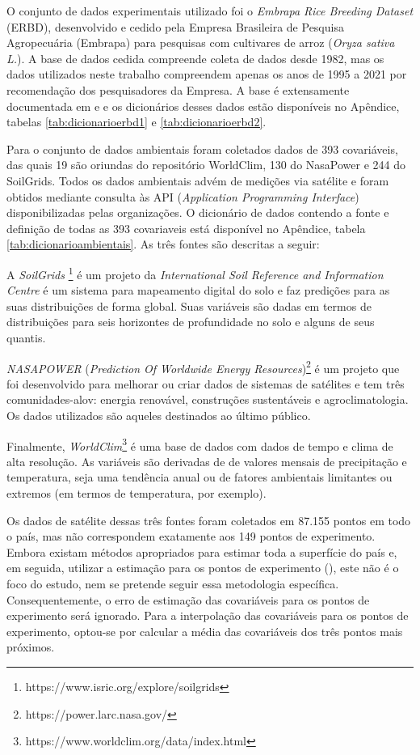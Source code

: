 \documentclass[12pt, a4paper, twoside]{report}
\numberwithin{equation}{subsection} %
\begin{document}

O conjunto de dados experimentais utilizado foi o \textit{Embrapa Rice Breeding Dataset} (ERBD), desenvolvido e cedido pela Empresa Brasileira de Pesquisa Agropecuária (Embrapa) para pesquisas com cultivares de arroz (\textit{Oryza sativa L.}). A base de dados cedida compreende coleta de dados desde 1982, mas os dados utilizados neste trabalho compreendem apenas os anos de 1995 a 2021 por recomendação dos pesquisadores da Empresa. A base é extensamente documentada em \cite{breseghello2011} e \cite{breseghello2021} e os dicionários desses dados estão disponíveis no Apêndice, tabelas \ref{tab:dicionarioerbd1} e \ref{tab:dicionarioerbd2}.

Para o conjunto de dados ambientais foram coletados dados de 393 covariáveis, das quais 19 são oriundas do repositório WorldClim, 130 do NasaPower e 244 do SoilGrids. Todos os dados ambientais advém de medições via satélite e foram obtidos mediante consulta às API (\textit{Application Programming Interface}) disponibilizadas pelas organizações. O dicionário de dados contendo a fonte e definição de todas as 393 covariaveis está disponível no Apêndice, tabela \ref{tab:dicionarioambientais}.  As três fontes são descritas a seguir:

A \textit{SoilGrids} \footnote{https://www.isric.org/explore/soilgrids} é um projeto da \textit{International Soil Reference and Information Centre} é um sistema para mapeamento digital do solo e faz predições  para as suas distribuições de forma global. Suas variáveis são dadas em termos de distribuições para seis horizontes de profundidade no solo e alguns de seus quantis.

\textit{NASAPOWER} (\textit{Prediction Of Worldwide Energy Resources})\footnote{https://power.larc.nasa.gov/} é um projeto que foi desenvolvido para melhorar ou criar dados de sistemas de satélites e tem três comunidades-alov: energia renovável, construções sustentáveis e agroclimatologia. Os dados utilizados são aqueles destinados ao último público.

Finalmente, \textit{WorldClim}\footnote{https://www.worldclim.org/data/index.html} é uma base de dados com dados de tempo e clima de alta resolução. As variáveis são derivadas de de valores mensais de precipitação e temperatura, seja uma tendência anual ou de fatores ambientais limitantes ou extremos (em termos de temperatura, por exemplo).

Os dados de satélite dessas três fontes foram coletados em 87.155 pontos em todo o país, mas não correspondem exatamente aos 149 pontos de experimento. Embora existam métodos apropriados para estimar toda a superfície do país e, em seguida, utilizar a estimação para os pontos de experimento (\cite{cokriging}), este não é o foco do estudo, nem se pretende seguir essa metodologia específica. Consequentemente, o erro de estimação das covariáveis para os pontos de experimento será ignorado. Para a interpolação das covariáveis para os pontos de experimento, optou-se por calcular a média das covariáveis dos três pontos mais próximos.
\end{document}
